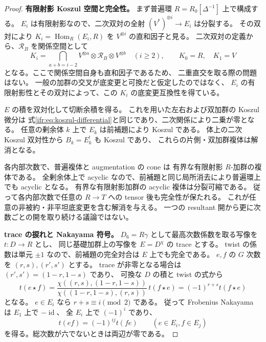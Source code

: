 \begin{proof}
\textbf{有限射影 Koszul 空間と完全性。}
まず普遍環 $R=R_0[\Delta^{-1}]$ 上で構成する。
$E_i$ は有限射影なので、二次双対の全射
$(V^*)^{\otimes i}\to E_i$ は分裂する。
その双対により $K_i=\operatorname{Hom}_R(E_i,R)$ を $V^{\otimes i}$ の直和因子と見る。
二次双対の定義から、$\mathcal R_B$ を関係空間として
\[
 K_i=\bigcap_{a+b=i-2}
       V^{\otimes a}\otimes\mathcal R_B\otimes V^{\otimes b}
                \quad(i\ge2),\qquad K_0=R,\quad K_1=V
\]
となる。ここで関係空間自身も直和因子であるため、
二重直交を取る際の問題はない。
一般の加群の交叉が底変更と可換だと仮定したのではなく、
$E_i$ の有限射影性とその双対によって、この $K_i$ の底変更互換性を得ている。

$E$ の積を双対化して切断余積を得る。
これを用いた左右および双加群の Koszul 微分は
式\eqref{ifr:eq:koszul-differential}と同じであり、二次関係により二乗が零となる。
任意の剰余体 $k$ 上で $E_k$ は前補題により Koszul である。
体上の二次 Koszul 双対性から $B_k=E_k^!$ も Koszul であり、
これらの片側・双加群複体は解消となる。

各内部次数で、普遍複体と augmentation の cone は
有界な有限射影 $R$-加群の複体である。
全剰余体上で acyclic なので、前補題と同じ局所消去により普遍環上でも acyclic となる。
有界な有限射影加群の acyclic 複体は分裂可縮である。
従って各内部次数で任意の $R\to T$ への tensor 後も完全性が保たれる。
これが任意の非被約・非平坦底変更を含む解消を与える。
一つの resultant 開から更に次数ごとの開を取り続ける議論ではない。

\textbf{trace の捩れと Nakayama 符号。}
$D_6=R\gamma$ として最高次数係数を取る写像を $t:D\to R$ とし、
同じ基礎加群上の写像を $E=D^\chi$ の trace とする。
twist の係数は単元 $\pm1$ なので、前補題の完全対合は $E$ 上でも完全である。
$e,f$ の $G$ 次数を $(r,s),(r',s')$ とする。
trace が非零となる場合は $(r',s')=(1-r,1-s)$ であり、
可換な $D$ の積と twist の式から
\[
 t(e\star f)
  =\frac{\chi((r,s),(1-r,1-s))}
          {\chi((1-r,1-s),(r,s))}\,t(f\star e)
  =(-1)^{r+s}t(f\star e)
\]
となる。
$e\in E_i$ なら $r+s\equiv i\pmod2$ である。
従って Frobenius Nakayama は $E_1$ 上で $-\operatorname{id}$、
全 $E_i$ 上で $(-1)^i$ であり、
\begin{equation}\label{ifb:eq:graded-trace}
       t(ef)=(-1)^{ij}t(fe)\qquad(e\in E_i, f\in E_j)
\end{equation}
を得る。総次数が六でないときは両辺が零である。


\end{proof}
